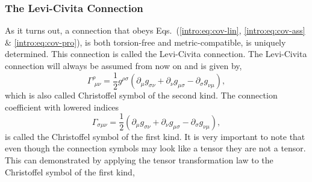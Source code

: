 \subsubsection{The Levi-Civita Connection}
As it turns out, a connection that obeys Eqs.~(\ref{intro:eq:cov-lin}, \ref{intro:eq:cov-ass} $\&$ \ref{intro:eq:cov-pro}), is both torsion-free and metric-compatible, is uniquely determined. This connection is called the Levi-Civita connection. The Levi-Civita connection will always be assumed from now on and is given by,
\begin{equation} \label{intro:eq:christoffel_def}
\Gamma^\rho_{\,\,\mu\nu} = \frac{1}{2}g^{\rho\sigma} ( \partial_{\mu} g_{\sigma\nu} + \partial_{\nu} g_{\mu\sigma} - \partial_{\sigma} g_{\nu\mu} ),
\end{equation}
which is also called Christoffel symbol of the second kind. The connection coefficient with lowered indices
\begin{equation}
\Gamma_{\sigma\mu\nu} = \frac{1}{2}( \partial_{\mu} g_{\sigma\nu} + \partial_{\nu} g_{\mu\sigma} - \partial_{\sigma} g_{\nu\mu} ),
\end{equation}
is called the Christoffel symbol of the first kind. It is very important to note that even though the connection symbols may look like a tensor they are not a tensor. This can demonstrated by applying the tensor transformation law to the Christoffel symbol of the first kind,
